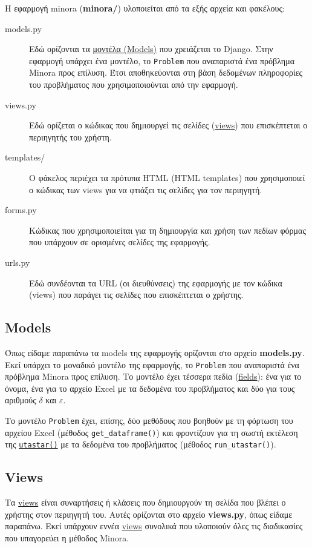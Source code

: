 \documentclass[11pt,a4paper,titlepage]{article}
\numberwithin{equation}{section}
\begin{document}
Η εφαρμογή minora (\textbf{minora/}) υλοποιείται από τα εξής αρχεία και φακέλους:
\begin{description}
\item[models.py] Εδώ ορίζονται τα \href{https://docs.djangoproject.com/en/3.2/topics/db/models/}{μοντέλα (Models)} που χρειάζεται το Django. Στην εφαρμογή υπάρχει ένα μοντέλο, το \texttt{Problem} που αναπαριστά ένα πρόβλημα Minora προς επίλυση. Έτσι αποθηκεύονται στη βάση δεδομένων πληροφορίες του προβλήματος που χρησιμοποιούνται από την εφαρμογή.
\item[views.py] Εδώ ορίζεται ο κώδικας που δημιουργεί τις σελίδες (\href{https://docs.djangoproject.com/en/3.2/topics/http/views/}{views}) που επισκέπτεται ο περιηγητής του χρήστη.
\item[templates/] Ο φάκελος περιέχει τα πρότυπα HTML (HTML templates) που χρησιμοποιεί ο κώδικας των views για να φτιάξει τις σελίδες για τον περιηγητή.
\item[forms.py] Κώδικας που χρησιμοποιείται για τη δημιουργία και χρήση των πεδίων φόρμας που υπάρχουν σε ορισμένες σελίδες της εφαρμογής.
\item[urls.py] Εδώ συνδέονται τα URL (οι διευθύνσεις) της εφαρμογής με τον κώδικα (views) που παράγει τις σελίδες που επισκέπτεται ο χρήστης.
\end{description}

\subsection{Models}
\label{ssec:models}
Όπως είδαμε παραπάνω τα models της εφαρμογής ορίζονται στο αρχείο \textbf{models.py}. Εκεί υπάρχει το μοναδικό 
μοντέλο της εφαρμογής, το \texttt{Problem} που αναπαριστά ένα πρόβλημα Minora προς επίλυση. Το μοντέλο έχει τέσσερα πεδία (\href{https://docs.djangoproject.com/en/3.2/ref/models/fields/}{fields}): ένα για το όνομα, ένα για το αρχείο Excel με τα δεδομένα του προβλήματος και δύο για τους αριθμούς $ \delta $ και $ \varepsilon $.

Το μοντέλο \texttt{Problem} έχει, επίσης, δύο μεθόδους που βοηθούν με τη φόρτωση του αρχείου Excel (μέθοδος \texttt{get\_dataframe()}) και φροντίζουν για τη σωστή εκτέλεση της \hyperref[sssec:utastar()]{\texttt{utastar()}} με τα δεδομένα του προβλήματος (μέθοδος \texttt{run\_utastar()}).

\subsection{Views}
\label{ssec:views}
Τα \href{https://docs.djangoproject.com/en/3.2/topics/http/views/}{views} είναι συναρτήσεις ή κλάσεις που δημιουργούν τη σελίδα που βλέπει ο χρήστης στον περιηγητή του. Αυτές ορίζονται στο αρχείο \textbf{views.py}, όπως είδαμε παραπάνω. Εκεί υπάρχουν εννέα \href{https://docs.djangoproject.com/en/3.2/topics/http/views/}{views} συνολικά που υλοποιούν όλες τις διαδικασίες που υπαγορεύει η μέθοδος Minora.
\end{document}
